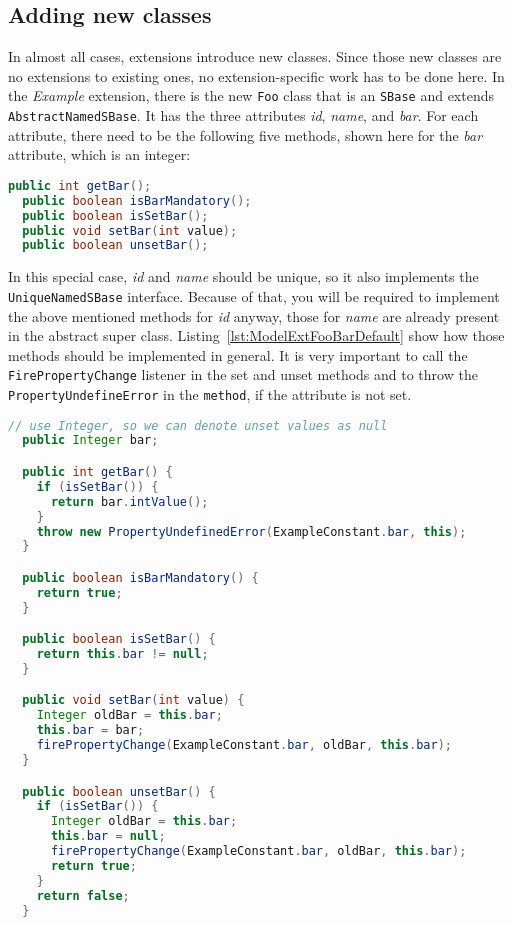 \subsection{Adding new classes}
\label{subsec:addingClasses}
In almost all cases, extensions introduce new classes.
Since those new classes are no extensions to existing ones, no extension-specific work has to be done here.
In the \emph{Example} extension, there is the new \texttt{Foo} class that is an \texttt{SBase} and extends \texttt{AbstractNamedSBase}.
It has the three attributes \emph{id}, \emph{name}, and \emph{bar}.
For each attribute, there need to be the following five methods, shown here for the \emph{bar} attribute, which is an integer:
\begin{lstlisting}[language=Java,float,caption={Five necessary methods that should be created for each \texttt{Foo} class attribute},label={lst:ModelExtFooBar}]
  public int getBar();
  public boolean isBarMandatory();
  public boolean isSetBar();
  public void setBar(int value);
  public boolean unsetBar();
\end{lstlisting}

In this special case, \emph{id} and \emph{name} should be unique, so it also implements the \texttt{UniqueNamedSBase} interface.
Because of that, you will be required to implement the above mentioned methods for \emph{id} anyway, those for \emph{name} are already present in the abstract super class.
Listing~\vref{lst:ModelExtFooBarDefault} show how those methods should be implemented in general. It is very important to call the \texttt{FirePropertyChange} listener in the set and unset methods and to throw the \texttt{PropertyUndefineError} in the \texttt{method}, if the attribute is not set.

\begin{lstlisting}[language=Java,caption={Five necessary methods that should be created for each \texttt{Foo} class attribute in detail},label={lst:ModelExtFooBarDefault}]
  // use Integer, so we can denote unset values as null
  public Integer bar;

  public int getBar() {
    if (isSetBar()) {
      return bar.intValue();
    }
    throw new PropertyUndefinedError(ExampleConstant.bar, this);
  }

  public boolean isBarMandatory() {
    return true;
  }

  public boolean isSetBar() {
    return this.bar != null;
  }

  public void setBar(int value) {
    Integer oldBar = this.bar;
    this.bar = bar;
    firePropertyChange(ExampleConstant.bar, oldBar, this.bar);
  }

  public boolean unsetBar() {
    if (isSetBar()) {
      Integer oldBar = this.bar;
      this.bar = null;
      firePropertyChange(ExampleConstant.bar, oldBar, this.bar);
      return true;
    }
    return false;
  }
\end{lstlisting}

